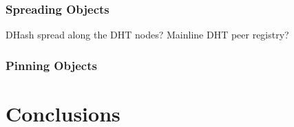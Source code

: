 \documentclass{sig-alternate}
\begin{document}
\subsubsection{Spreading Objects}

DHash spread along the DHT nodes?
Mainline DHT peer registry?

\subsubsection{Pinning Objects}


\section{Conclusions}






%
%
\end{document}
